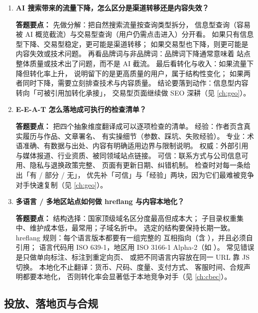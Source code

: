 \begin{interview}[题库与答题要点]
\begin{enumerate}[label=]
  \item[\textcolor{VioletDeep}{\textbf{Q91.}}] \textbf{AI 搜索带来的流量下降，怎么区分是渠道转移还是内容失效？}
\par\smallskip\noindent\textcolor{VioletDeep}{\textbf{答题要点：}}
先做分解：把自然搜索流量按查询类型拆分，
信息型查询（容易被 AI 概览截流）与交易型查询（用户仍需点击进入）分开看。
如果只有信息型下降、交易型稳定，更可能是渠道转移；
如果交易型也下降，则更可能是内容失效或技术问题。
再看品牌词与非品牌词：品牌词下降通常意味着
站点整体质量或技术出了问题，而不是 AI 截流。
最后看转化与收入：如果流量下降但转化率上升，
说明留下的是更高质量的用户，属于结构性变化；
如果两者同时下降，需要立刻排查技术与内容质量。
结论要落到动作：信息型内容转向「可被引用加转化承接」，
交易型页面继续做 SEO 深耕（见 \cref{ch:geo}）。

  \item[\textcolor{VioletDeep}{\textbf{Q92.}}] \textbf{E-E-A-T 怎么落地成可执行的检查清单？}
\par\smallskip\noindent\textcolor{VioletDeep}{\textbf{答题要点：}}
把四个抽象维度翻译成可以逐项检查的清单。
经验：作者页含真实履历与作品、文章署名、
有实操细节（参数、踩坑、失败经验）。
专业：术语准确、有数据与出处、内容有明确适用边界与限制说明。
权威：外部引用与媒体报道、行业资质、被同领域站点链接。
可信：联系方式与公司信息可用、隐私与退换政策完整、
页面有更新日期、纠错机制。
检查时对每一条给出「有 / 部分 / 无」，
优先补「可信」与「经验」两块，因为它们最难被竞争对手快速复制（见 \cref{ch:geo}）。

  \item[\textcolor{VioletDeep}{\textbf{Q93.}}] \textbf{多语言 / 多地区站点如何做 hreflang 与内容本地化？}
\par\smallskip\noindent\textcolor{VioletDeep}{\textbf{答题要点：}}
结构选择：国家顶级域名区分度最高但成本大；
子目录权重集中、维护成本低，最常用；子域名折中。
选定的结构要保持长期一致。
hreflang 规则：每个语言版本都要有一组完整的
 互相指向（含 ），并且必须自引用；
语言代码用 ISO 639-1，地区用 ISO 3166-1 Alpha-2（如 ）。
常见错误是只做单向标注、标注到重定向页、
或把不同语言内容放在同一 URL 靠 JS 切换。
本地化不止翻译：货币、尺码、度量、支付方式、
客服时间、合规声明都要本地化，
否则转化率会显著低于本地竞争对手（见 \cref{ch:cbec}）。

\end{enumerate}

\end{interview}

\subsection{投放、落地页与合规}

